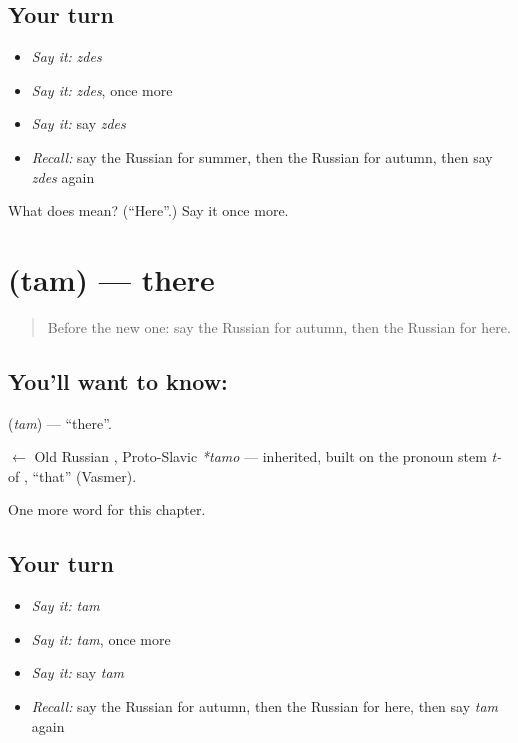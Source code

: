 \subsection*{Your turn}
\begin{itemize}
\raggedright
  \item \emph{Say it:} \emph{zdes}
  \item \emph{Say it:} \emph{zdes}, once more
  \item \emph{Say it:} say \emph{zdes}
  \item \emph{Recall:} say the Russian for summer, then the Russian for autumn, then say \emph{zdes} again
\end{itemize}

\begin{tcolorbox}[breakable,colback=teal!4,colframe=teal!35!black,title={Before you move on}]
What does  mean? (\textquotedblleft{}Here\textquotedblright{}.) Say it once more.
\end{tcolorbox}
\section[\texorpdfstring{\ru{там} (tam)}{там (tam)}]{ (tam) — there}

\label{lesson:RU-C72-there}



\begin{quote}
Before the new one: say the Russian for autumn, then the Russian for here.
\end{quote}

\subsection*{You'll want to know: }
\textbf{} (\emph{tam}) — \textquotedblleft{}there\textquotedblright{}.

\begin{cousinweb}
\textbf{} $\leftarrow$ Old Russian \emph{}, Proto-Slavic \emph{*tamo} — inherited, built on the pronoun stem \emph{t-} of \emph{}, \textquotedblleft{}that\textquotedblright{} (Vasmer).
\end{cousinweb}

\begin{grammarlens}[title={What you've built}]
One more word for this chapter.
\end{grammarlens}

\subsection*{Your turn}
\begin{itemize}
\raggedright
  \item \emph{Say it:} \emph{tam}
  \item \emph{Say it:} \emph{tam}, once more
  \item \emph{Say it:} say \emph{tam}
  \item \emph{Recall:} say the Russian for autumn, then the Russian for here, then say \emph{tam} again
\end{itemize}

